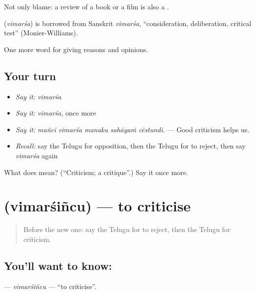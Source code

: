 Not only blame: a review of a book or a film is also a .

\begin{cousinweb}
\textbf{} (\emph{vimarśa}) is borrowed from Sanskrit \emph{vimarśa}, \textquotedblleft{}consideration, deliberation, critical test\textquotedblright{} (Monier-Williams).
\end{cousinweb}

\begin{grammarlens}[title={What you've built}]
One more word for giving reasons and opinions.
\end{grammarlens}

\subsection*{Your turn}
\begin{itemize}
\raggedright
  \item \emph{Say it:} \emph{vimarśa}
  \item \emph{Say it:} \emph{vimarśa}, once more
  \item \emph{Say it:} \emph{mañci vimarśa manaku sahāyaṁ cēstundi.} — Good criticism helps us.
  \item \emph{Recall:} say the Telugu for opposition, then the Telugu for to reject, then say \emph{vimarśa} again
\end{itemize}

\begin{tcolorbox}[breakable,colback=teal!4,colframe=teal!35!black,title={Before you move on}]
What does  mean? (\textquotedblleft{}Criticism; a critique\textquotedblright{}.) Say it once more.
\end{tcolorbox}
\section[\texorpdfstring{\te{విమర్శించు} (vimarśiñcu)}{విమర్శించు (vimarśiñcu)}]{ (vimarśiñcu) — to criticise}

\label{lesson:TE-C387-vimarsincu}



\begin{quote}
Before the new one: say the Telugu for to reject, then the Telugu for criticism.
\end{quote}

\subsection*{You'll want to know: }
\textbf{} — \emph{vimarśiñcu} — \textquotedblleft{}to criticise\textquotedblright{}.

